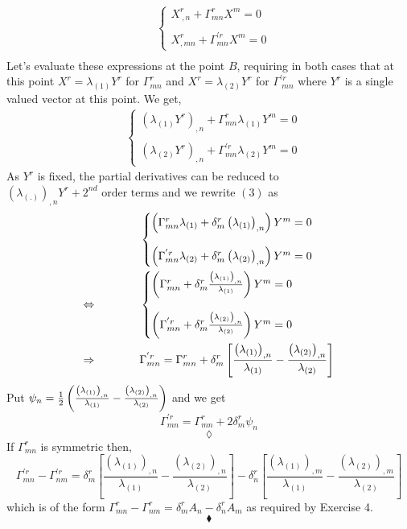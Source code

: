 \begin{align}
&\left\{\begin{matrix}
X^r_{\ ,n}+ \Gamma^r_{mn}X^m=0\\\\
X^{r}_{, mn}+ \Gamma^{'r}_{mn}X^m=0
\end{matrix}\right.\\
\end{align}
Let's evaluate these expressions at the point $B$, requiring in both cases that at this point $X^r=\lambda_{(1)} Y^r$ for $\Gamma^r_{mn}$ and $X^r=\lambda_{(2)} Y^r$ for $\Gamma^{'r}_{\ mn}$ where $Y^r$ is a single valued vector at this point. 
We get,
\begin{align}
&\left\{\begin{matrix}
\left(\lambda_{(1)} Y^r\right)_{, n}+ \Gamma^r_{mn}\lambda_{(1)} Y^m=0\\\\
\left(\lambda_{(2)}Y^r\right)_{, n}+ \Gamma^{'r}_{mn}\lambda_{(2)} Y^m=0
\end{matrix}\right.
\end{align}
As $Y^r$ is fixed, the partial derivatives can be reduced to $\left(\lambda_{(.)} \right)_{, n}Y^r + 2^{nd}\text{  order terms}$ and we rewrite $(3)$ as
\begin{align*}
&\left\{\begin{matrix}
\left(\Gamma^r_{mn}\lambda_{(1)}+\delta^r_m\left(\lambda_{(1)}\right)_{, n}  \right) Y^m=0\\\\
\left(\Gamma^{'r}_{mn}\lambda_{(2)}+\delta^r_m\left(\lambda_{(2)}\right)_{, n}  \right) Y^m=0
\end{matrix}\right.\\
\Leftrightarrow \quad\quad\quad\quad &\left\{\begin{matrix}
\left(\Gamma^r_{mn}+\delta^r_m\frac{\left(\lambda_{(1)}\right)_{, n}}{\lambda_{(1)}}  \right) Y^m=0\\\\
\left(\Gamma^{'r}_{mn}+\delta^r_m\frac{\left(\lambda_{(2)}\right)_{, n}}{\lambda_{(2)}} \right) Y^m=0
\end{matrix}\right.\\
\Rightarrow \quad\quad\quad\quad &\Gamma^{'r}_{mn}= \Gamma^r_{mn}+\delta^r_m\left[\frac{\left(\lambda_{(1)}\right)_{, n}}{\lambda_{(1)}}-\frac{\left(\lambda_{(2)}\right)_{, n}}{\lambda_{(2)}}  \right]
\end{align*}
Put $\psi_n = \frac{1}{2}\left(\frac{\left(\lambda_{(1)}\right)_{, n}}{\lambda_{(1)}}-\frac{\left(\lambda_{(2)}\right)_{, n}}{\lambda_{(2)}}\right) $
and we get $$\Gamma^{'r}_{mn}= \Gamma^r_{mn}+2\delta^r_m\psi_n  $$
$$\lozenge$$
If $\Gamma^r_{mn}$ is symmetric then,
$$\Gamma^{'r}_{mn}-\Gamma^{'r}_{nm}= \delta^r_m\left[\frac{\left(\lambda_{(1)}\right)_{, n}}{\lambda_{(1)}}-\frac{\left(\lambda_{(2)}\right)_{, n}}{\lambda_{(2)}}  \right]-\delta^r_n\left[\frac{\left(\lambda_{(1)}\right)_{, m}}{\lambda_{(1)}}-\frac{\left(\lambda_{(2)}\right)_{, m}}{\lambda_{(2)}}  \right] $$
which is of the form $\Gamma^r_{mn}-\Gamma^r_{nm} = \delta^r_mA_n - \delta^r_n A_m$ as required by Exercise 4. 
$$\blacklozenge$$
\newpage


